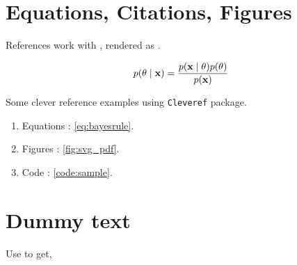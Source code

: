 \documentclass{article}
\begin{document}
\section{Equations, Citations, Figures}

References work with , rendered as \citet{kapoor2020variational}.

\begin{align}
p(\theta \mid {\ensuremath{\boldsymbol{\mathbf{x}}}}) = \frac{p({\boldsymbol{\mathbf{x}}}\mid\theta)p(\theta)}{p({\boldsymbol{\mathbf{x}}})} \label{eq:bayesrule}
\end{align}

Some clever reference examples using \texttt{Cleveref} package.

\begin{enumerate}
\item Equations : \cref{eq:bayesrule}.
\item Figures : \cref{fig:svg_pdf}.
\item Code : \cref{code:sample}.
\end{enumerate}

\section{Dummy text}

Use \vrb{\kant[1]} to get,

\kant[1]

\clearpage

% 

\end{document}
